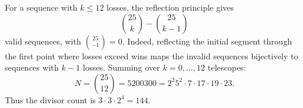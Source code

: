 For a sequence with $k\le12$ losses, the reflection principle gives
\[
\binom{25}{k}-\binom{25}{k-1}
\]
valid sequences, with $\binom{25}{-1}=0$. Indeed, reflecting the initial segment through the first point where losses exceed wins maps the invalid sequences bijectively to sequences with $k-1$ losses. Summing over $k=0,\ldots,12$ telescopes:
\[
N=\binom{25}{12}=5200300=2^2 5^2\cdot7\cdot17\cdot19\cdot23.
\]
Thus the divisor count is $\boxed{3\cdot3\cdot2^4=144}$.
